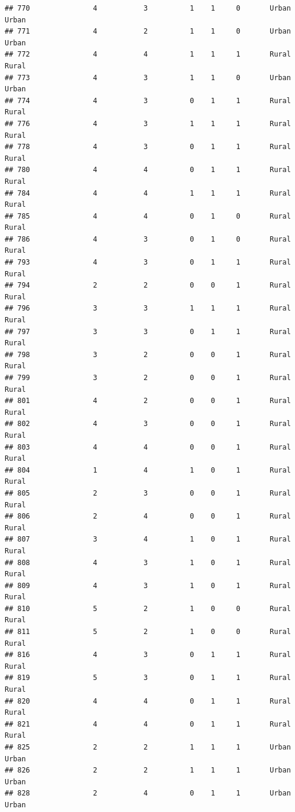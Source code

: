 \documentclass[
]{article}
\begin{document}
\begin{verbatim}
## 770               4           3          1    1     0       Urban Urban
## 771               4           2          1    1     0       Urban Urban
## 772               4           4          1    1     1       Rural Rural
## 773               4           3          1    1     0       Urban Urban
## 774               4           3          0    1     1       Rural Rural
## 776               4           3          1    1     1       Rural Rural
## 778               4           3          0    1     1       Rural Rural
## 780               4           4          0    1     1       Rural Rural
## 784               4           4          1    1     1       Rural Rural
## 785               4           4          0    1     0       Rural Rural
## 786               4           3          0    1     0       Rural Rural
## 793               4           3          0    1     1       Rural Rural
## 794               2           2          0    0     1       Rural Rural
## 796               3           3          1    1     1       Rural Rural
## 797               3           3          0    1     1       Rural Rural
## 798               3           2          0    0     1       Rural Rural
## 799               3           2          0    0     1       Rural Rural
## 801               4           2          0    0     1       Rural Rural
## 802               4           3          0    0     1       Rural Rural
## 803               4           4          0    0     1       Rural Rural
## 804               1           4          1    0     1       Rural Rural
## 805               2           3          0    0     1       Rural Rural
## 806               2           4          0    0     1       Rural Rural
## 807               3           4          1    0     1       Rural Rural
## 808               4           3          1    0     1       Rural Rural
## 809               4           3          1    0     1       Rural Rural
## 810               5           2          1    0     0       Rural Rural
## 811               5           2          1    0     0       Rural Rural
## 816               4           3          0    1     1       Rural Rural
## 819               5           3          0    1     1       Rural Rural
## 820               4           4          0    1     1       Rural Rural
## 821               4           4          0    1     1       Rural Rural
## 825               2           2          1    1     1       Urban Urban
## 826               2           2          1    1     1       Urban Urban
## 828               2           4          0    1     1       Urban Urban

\end{verbatim}
\end{document}
